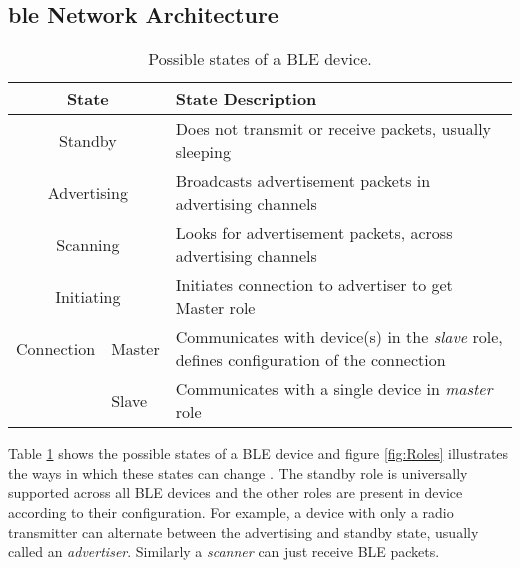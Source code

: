 \subsection[\texorpdfstring{\gls{ble}}{BLE} Network Architecture]{\texorpdfstring{\gls{ble}}{BLE} Network Architecture}

\begin{table}[tb]
\begin{center}
\vspace{-10pt}
\setlength{\extrarowheight}{1.5pt}
\begin{tabular}{|m{2.5cm}|m{1.2cm}|m{11.4cm}|}
\hline
\multicolumn{ 2}{|c|}{\textbf{State}} & \textbf{State Description} \\ \hline
\multicolumn{ 2}{|c|}{Standby} & Does not transmit or receive packets, usually sleeping \\ \hline
\multicolumn{ 2}{|c|}{Advertising} & Broadcasts advertisement packets in  advertising channels \\ \hline
\multicolumn{ 2}{|c|}{Scanning} & Looks for advertisement packets, across advertising channels \\ \hline
\multicolumn{ 2}{|c|}{Initiating} & Initiates connection to advertiser to get Master role \\ \hline
\multicolumn{ 1}{|m{2.0cm}|}{\hspace{42pt} \mbox{Connection}} & Master & Communicates with device(s) in the \emph{slave} role, defines configuration of the connection \\ \cline{ 2- 3}
\multicolumn{ 1}{|l|}{} & Slave & Communicates with a single device in \emph{master} role \\ \hline
\end{tabular}
\end{center}
\vspace{-12pt}
\caption{Possible states of a BLE device.}
\vspace{-6pt}
\label{tbl:BLEstates}
\end{table}

Table \ref{tbl:BLEstates} shows the possible states of a BLE device and figure \ref{fig:Roles} illustrates the ways in which these states can change \cite{BLE101}. The standby role is universally supported across all BLE devices and the other roles are present in device according to their configuration. For example, a device with only a radio transmitter can alternate between the advertising and standby state, usually called an \emph{advertiser}. Similarly a \emph{scanner} can just receive BLE packets.

